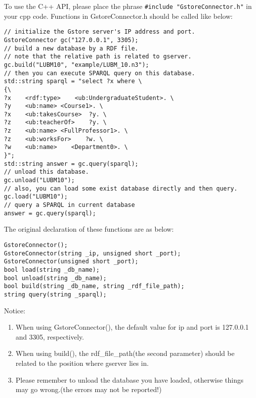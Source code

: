 \documentclass[titlepage, a4paper, 12pt]{article}
\begin{document}


To use the C++ API, please place the phrase
\texttt{\#include\ "GstoreConnector.h"} in your cpp code. Functions in
GstoreConnector.h should be called like below:

\begin{verbatim}
// initialize the Gstore server's IP address and port.
GstoreConnector gc("127.0.0.1", 3305);
// build a new database by a RDF file.
// note that the relative path is related to gserver.
gc.build("LUBM10", "example/LUBM_10.n3");
// then you can execute SPARQL query on this database.
std::string sparql = "select ?x where \
{\
?x    <rdf:type>    <ub:UndergraduateStudent>. \
?y    <ub:name> <Course1>. \
?x    <ub:takesCourse>  ?y. \
?z    <ub:teacherOf>    ?y. \
?z    <ub:name> <FullProfessor1>. \
?z    <ub:worksFor>    ?w. \
?w    <ub:name>    <Department0>. \
}";
std::string answer = gc.query(sparql);
// unload this database.
gc.unload("LUBM10");
// also, you can load some exist database directly and then query.
gc.load("LUBM10");
// query a SPARQL in current database
answer = gc.query(sparql);
\end{verbatim}

The original declaration of these functions are as below:

\begin{verbatim}
GstoreConnector();
GstoreConnector(string _ip, unsigned short _port);
GstoreConnector(unsigned short _port);
bool load(string _db_name);
bool unload(string _db_name);
bool build(string _db_name, string _rdf_file_path);
string query(string _sparql);
\end{verbatim}

Notice:

\begin{enumerate}
\item
  When using GstoreConnector(), the default value for ip and port is
  127.0.0.1 and 3305, respectively.
\item
  When using build(), the rdf\_file\_path(the second parameter) should
  be related to the position where gserver lies in.
\item
  Please remember to unload the database you have loaded, otherwise
  things may go wrong.(the errors may not be reported!)
\end{enumerate}
\end{document}
